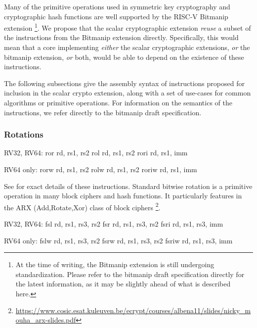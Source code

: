 Many of the primitive operations used in symmetric key cryptography
and cryptographic hash functions are well supported by the
RISC-V Bitmanip \cite{riscv:bitmanip:repo} extension
\footnote{
At the time of writing, the Bitmanip extension is still undergoing
standardization.
Please refer to the bitmanip draft specification
\cite{riscv:bitmanip:draft}
directly for the
latest information, as it may be slightly ahead of what is described
here.
}.
We propose that the scalar cryptographic extension {\em reuse} a
subset of the instructions from the Bitmanip extension directly.
Specifically, this would mean that
a core implementing
{\em either}
the scalar cryptographic extensions,
{\em or}
the bitmanip extension,
{\em or}
both,
would be able to depend on the existence of these instructions.

The following subsections give the assembly syntax of instructions
proposed for inclusion in the scalar crypto extension, along with a
set of use-cases for common algorithms or primitive operations.
For information on the semantics of the instructions, we refer directly
to the bitmanip draft specification.

\subsubsection{Rotations}

\begin{cryptobitmanipisa}
RV32, RV64:
    ror    rd, rs1, rs2
    rol    rd, rs1, rs2
    rori   rd, rs1, imm

RV64 only:
    rorw   rd, rs1, rs2
    rolw   rd, rs1, rs2
    roriw  rd, rs1, imm
\end{cryptobitmanipisa}

See \cite[Section 3.1.1]{riscv:bitmanip:draft} for exact details of
these instructions.
Standard bitwise rotation is a primitive operation in many block ciphers and
hash functions.
It particularly features in the ARX (Add,Rotate,Xor) class of
block ciphers
\footnote{\url{https://www.cosic.esat.kuleuven.be/ecrypt/courses/albena11/slides/nicky_mouha_arx-slides.pdf}}.

\begin{cryptobitmanipisa}
RV32, RV64:
    fsl   rd, rs1, rs3, rs2
    fsr   rd, rs1, rs3, rs2
    fsri  rd, rs1, rs3, imm

RV64 only:
    fslw  rd, rs1, rs3, rs2
    fsrw  rd, rs1, rs3, rs2
    fsriw rd, rs1, rs3, imm
\end{cryptobitmanipisa}

